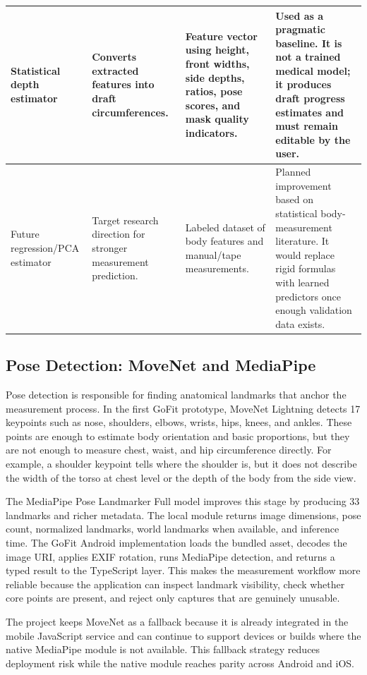 \documentclass[12pt,a4paper,openany]{report}
\begin{document}
\begin{longtable}{|L{2.74cm}|L{5.18cm}|L{4.18cm}|L{2.30cm}|}
Statistical depth estimator & Converts extracted features into draft circumferences. & Feature vector using height, front widths, side depths, ratios, pose scores, and mask quality indicators. & Used as a pragmatic baseline. It is not a trained medical model; it produces draft progress estimates and must remain editable by the user. \\ \hline
Future regression/PCA estimator & Target research direction for stronger measurement prediction. & Labeled dataset of body features and manual/tape measurements. & Planned improvement based on statistical body-\allowbreak measurement literature. It would replace rigid formulas with learned predictors once enough validation data exists. \\ \hline
\end{longtable}
\endgroup

\subsection{Pose Detection: MoveNet and MediaPipe}

Pose detection is responsible for finding anatomical landmarks that anchor the measurement process. In the first GoFit prototype, MoveNet Lightning detects 17 keypoints such as nose, shoulders, elbows, wrists, hips, knees, and ankles. These points are enough to estimate body orientation and basic proportions, but they are not enough to measure chest, waist, and hip circumference directly. For example, a shoulder keypoint tells where the shoulder is, but it does not describe the width of the torso at chest level or the depth of the body from the side view.


The MediaPipe Pose Landmarker Full model improves this stage by producing 33 landmarks and richer metadata. The local module returns image dimensions, pose count, normalized landmarks, world landmarks when available, and inference time. The GoFit Android implementation loads the bundled  asset, decodes the image URI, applies EXIF rotation, runs MediaPipe detection, and returns a typed result to the TypeScript layer. This makes the measurement workflow more reliable because the application can inspect landmark visibility, check whether core points are present, and reject only captures that are genuinely unusable.


The project keeps MoveNet as a fallback because it is already integrated in the mobile JavaScript service and can continue to support devices or builds where the native MediaPipe module is not available. This fallback strategy reduces deployment risk while the native module reaches parity across Android and iOS.
\end{document}
